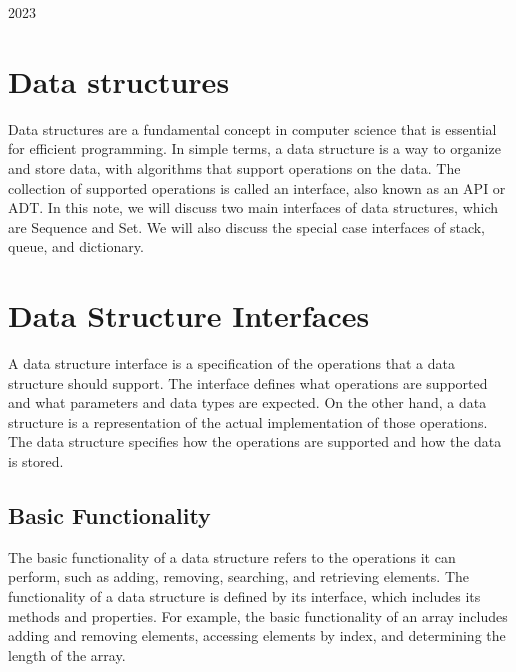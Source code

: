\documentclass[a4paper, 11pt, oneside]{book} %
\begin{document}
\begin{titlepage}
	\vspace{0.5\baselineskip} %
	
	\vfill %
	
	
	
	
	\vspace{0.3\baselineskip} %
	
	2023 %

\end{titlepage}

\section{Data structures}
Data structures are a fundamental concept in computer science that is essential for efficient programming. In simple terms, a data structure is a way to organize and store data, with algorithms that support operations on the data. The collection of supported operations is called an interface, also known as an API or ADT. In this note, we will discuss two main interfaces of data structures, which are Sequence and Set. We will also discuss the special case interfaces of stack, queue, and dictionary.

\section{Data Structure Interfaces}
A data structure interface is a specification of the operations that a data structure should support. The interface defines what operations are supported and what parameters and data types are expected. On the other hand, a data structure is a representation of the actual implementation of those operations. The data structure specifies how the operations are supported and how the data is stored.

\subsection{Basic Functionality}
The basic functionality of a data structure refers to the operations it can perform, such as adding, removing, searching, and retrieving elements. The functionality of a data structure is defined by its interface, which includes its methods and properties. For example, the basic functionality of an array includes adding and removing elements, accessing elements by index, and determining the length of the array.
\end{document}
